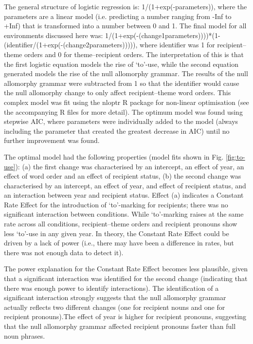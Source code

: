 	The general structure of logistic regression is: 1/(1+exp(-parameters)), where the parameters are a linear model (i.e. predicting a number ranging from -Inf to +Inf) that is transformed into a number between 0 and 1. The final model for all environments discussed here was: 1/(1+exp(-(change1parameters))))*(1-(identifier/(1+exp(-(change2parameters))))), where identifier was 1 for recipient--theme orders and 0 for theme--recipient orders. The interpretation of this is that the first logistic equation models the rise of `to'-use, while the second equation generated models the rise of the null allomorphy grammar. The results of the null allomorphy grammar were subtracted from 1 so that the identifier would cause the null allomorphy change to only affect recipient--theme word orders. This complex model was fit using the nloptr R package for non-linear optimisation (see the accompanying R files for more detail). The optimum model was found using stepwise AIC, where parameters were individually added to the model (always including the parameter that created the greatest decrease in AIC) until no further improvement was found.

	The optimal model had the following properties (model fits shown in Fig. \ref{fig:to-use}): (a) the first change was characterised by an intercept, an effect of year, an effect of word order and an effect of recipient status, (b) the second change was characterised by an intercept, an effect of year, and effect of recipient status, and an interaction between year and recipient status. Effect (a) indicates a Constant Rate Effect for the introduction of `to'-marking for recipients; there was no significant interaction between conditions. While `to'-marking raises at the same rate across all conditions, recipient--theme orders and recipient pronouns show less `to'-use in any given year. In theory, the Constant Rate Effect could be driven by a lack of power (i.e., there may have been a difference in rates, but there was not enough data to detect it).
	
	The power explanation for the Constant Rate Effect becomes less plausible, given that a significant interaction was identified for the second change (indicating that there was enough power to identify interactions). The identification of a significant interaction strongly suggests that the null allomorphy grammar actually reflects two different changes (one for recipient nouns and one for recipient pronouns).The effect of year is higher for recipient pronouns, suggesting that the null allomorphy grammar affected recipient pronouns faster than full noun phrases.
	
